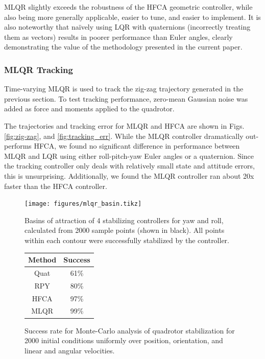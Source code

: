 \documentclass{svproc}
\begin{document}
	    MLQR slightly exceeds the robustness of the HFCA geometric controller, while also being more generally applicable, easier to tune, and easier to implement. It is also noteworthy that na\"ively using LQR with quaternions (incorrectly treating them as vectors) results in poorer performance than Euler angles, clearly demonstrating the value of the methodology presented in the current paper.
	    
	    \subsubsection{MLQR Tracking}
	    Time-varying MLQR is used to track the zig-zag trajectory generated in the previous section. %
	    To test tracking performance, zero-mean Gaussian noise was added as force and moments applied to the quadrotor.
	    
	    The trajectories and tracking error for MLQR and HFCA are shown in Figs. \ref{fig:zig-zag}, and \ref{fig:tracking_err}. While the MLQR controller dramatically out-performs HFCA, we found no significant difference in performance between MLQR and LQR using either roll-pitch-yaw Euler angles or a quaternion. Since the tracking controller only deals with relatively small state and attitude errors, this is unsurprising. Additionally, we found the MLQR controller ran about 20x faster than the HFCA controller.
	    
	    
	    \begin{figure}[h]
	        \begin{minipage}{0.60\linewidth}
    	        \centering
    	        \texttt{[image: figures/mlqr\_basin.tikz]}
    	        \caption{Basins of attraction of 4 stabilizing controllers for yaw and roll, calculated from 2000 sample points (shown in black). All points within each contour were successfully stabilized by the controller.}
    	        \label{fig:mlqr_basin}
	        \end{minipage}
	        \hspace{0.05\linewidth}
            \begin{minipage}{0.34\linewidth}
                \centering
                \begin{tabular}{cc}
                    \toprule
                    \textbf{Method} & \textbf{Success} \\
                    \midrule
                    Quat & 61\% \\
                    RPY  & 80\% \\
                    HFCA & 97\% \\
                    MLQR & 99\% \\
                    \bottomrule
                \end{tabular}
                \captionsetup{type=table}
                \caption{Success rate for Monte-Carlo analysis of quadrotor stabilization for 2000 initial conditions uniformly over position, orientation, and linear and angular velocities.}
                \label{tab:mlqr_success}
            \end{minipage}
	    \end{figure}
        
\end{document}
